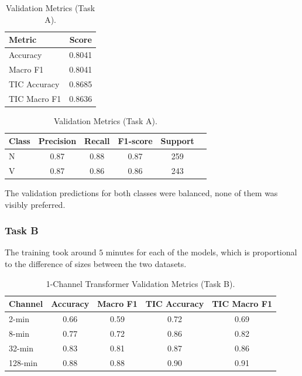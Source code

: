 \begin{table}[H]
    \centering
    \footnotesize
    \renewcommand{\arraystretch}{1.1}

    \begin{minipage}[t]{0.32\textwidth}
        \centering
        \begin{tabularx}{\textwidth}{X c}
            \toprule
            \textbf{Metric} & \textbf{Score} \tabularnewline
            \midrule
            Accuracy    &  0.8041 \tabularnewline
            Macro F1    & 0.8041 \tabularnewline
            TIC Accuracy & 0.8685 \tabularnewline
            TIC Macro F1 & 0.8636 \tabularnewline
            \bottomrule
        \end{tabularx}
    \end{minipage}
    \hfill
    \begin{minipage}[t]{0.64\textwidth}
        \centering
        \footnotesize
        \begin{tabularx}{\textwidth}{X c c c c c}
            \toprule
            \textbf{Class} & \textbf{Precision} & \textbf{Recall} & \textbf{F1-score} & \textbf{Support} \tabularnewline
            \midrule
            N & 0.87 & 0.88 & 0.87 & 259 \tabularnewline
            V & 0.87 & 0.86 & 0.86 & 243   \tabularnewline
            \bottomrule
        \end{tabularx}
    \end{minipage}

    \caption[Phase 2 -- 32-min Transformer Validation Metrics (A)]{Validation Metrics (Task A).}
    \label{tab:06_phase_2_32_min_channel_transformer_validation_,etrics_a}
\end{table}

\FloatBarrier

The validation predictions for both classes were balanced, none of them was visibly preferred.

\subsubsection{Task B}

The training took around $5$ minutes for each of the models, which is proportional to the difference of sizes between the two datasets.

\begin{table}[H]
    \centering
    \small
    \renewcommand{\arraystretch}{1.1}
    \begin{tabularx}{\textwidth}{X c c c c}
        \toprule
        \textbf{Channel} & \textbf{Accuracy} & \textbf{Macro F1} & \textbf{TIC Accuracy} & \textbf{TIC Macro F1}  \tabularnewline
        \midrule
        2-min & 0.66 & 0.59 & 0.72 & 0.69 \tabularnewline
        8-min & 0.77 & 0.72 & 0.86 & 0.82 \tabularnewline
        32-min & 0.83 & 0.81 & 0.87 & 0.86 \tabularnewline
        128-min & 0.88 & 0.88 & 0.90 & 0.91 \tabularnewline
        \bottomrule
    \end{tabularx}
    \caption[Phase 2 -- 1-Channel Transformer Metrics (B)]{1-Channel Transformer Validation Metrics (Task B).}
    \label{tab:06_phase_2_1_channel_b}
\end{table}


